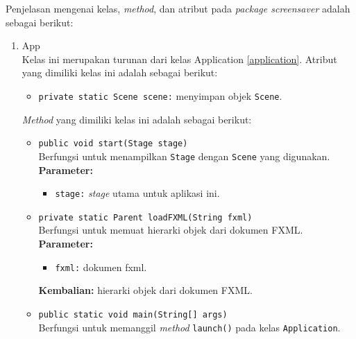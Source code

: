 Penjelasan mengenai kelas, \textit{method}, dan atribut pada \textit{package screensaver} adalah sebagai berikut:
\begin{enumerate}

\item{App}\\
Kelas ini merupakan turunan dari kelas Application \ref{application}. Atribut yang dimiliki kelas ini adalah sebagai berikut:
\begin{itemize}
    \item \texttt{private static Scene scene:} menyimpan objek \texttt{Scene}.
\end{itemize}
\textit{Method} yang dimiliki kelas ini adalah sebagai berikut:
\begin{itemize}
    \item \texttt{public void start(Stage stage)}\\
    Berfungsi untuk menampilkan \texttt{Stage} dengan \texttt{Scene} yang digunakan.\\
    \textbf{Parameter:}
	\begin{itemize}
		\item \texttt{stage:} \textit{stage} utama untuk aplikasi ini.
	\end{itemize}
    \item \texttt{private static Parent loadFXML(String fxml)}\\
    Berfungsi untuk memuat hierarki objek dari dokumen FXML.\\
    \textbf{Parameter:}
	\begin{itemize}
		\item \texttt{fxml:} dokumen fxml.
	\end{itemize}
	\textbf{Kembalian:} hierarki objek dari dokumen FXML.
    \item \texttt{public static void main(String[] args)}\\
    Berfungsi untuk memanggil \textit{method} \texttt{launch()} pada kelas \texttt{Application}.
\end{itemize}


\end{enumerate}
